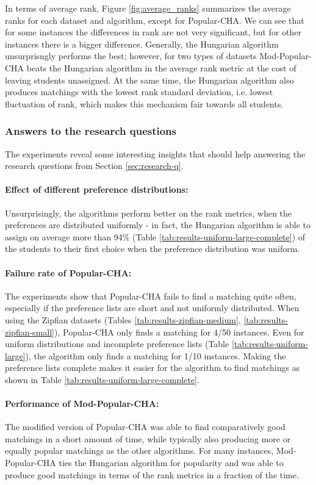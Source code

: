 In terms of average rank, Figure \ref{fig:average_ranks} summarizes the average ranks for each dataset and algorithm, except for Popular-CHA. We can see that for some instances the differences in rank are not very significant, but for other instances there is a bigger difference. Generally, the Hungarian algorithm unsurprisngly performs the best; however, for two types of datasets Mod-Popular-CHA beats the Hungarian algorithm in the average rank metric at the cost of leaving students unassigned. At the same time, the Hungarian algorithm also produces matchings with the lowest rank standard deviation, i.e. lowest fluctuation of rank, which makes this mechanism fair towards all students.

\subsubsection{Answers to the research questions}
The experiments reveal some interesting insights that should help answering the research questions from Section \ref{sec:research-q}.

\paragraph{Effect of different preference distributions:} Unsurprisingly, the algorithms perform better on the rank metrics, when the preferences are distributed uniformly - in fact, the Hungarian algorithm is able to assign on average more than 94\% (Table \ref{tab:results-uniform-large-complete}) of the students to their first choice when the preference distribution was uniform.
\paragraph{Failure rate of Popular-CHA:} The experiments show that \mbox{Popular-CHA} fails to find a matching quite often, especially if the preference lists are short and not uniformly distributed. When using the Zipfian datasets (Tables \ref{tab:results-zipfian-medium}, \ref{tab:results-zipfian-small}), Popular-CHA only finds a matching for 4/50 instances. Even for uniform distributions and incomplete preference lists (Table \ref{tab:results-uniform-large}), the algorithm only finds a matching for 1/10 instances. Making the preference lists complete makes it easier for the algorithm to find matchings as shown in Table \ref{tab:results-uniform-large-complete}.
\paragraph{Performance of Mod-Popular-CHA:} The modified version of Popular-CHA was able to find comparatively good matchings in a short amount of time, while typically also producing more or equally popular matchings as the other algorithms. For many instances, Mod-Popular-CHA ties the Hungarian algorithm for popularity and was able to produce good matchings in terms of the rank metrics in a fraction of the time.
